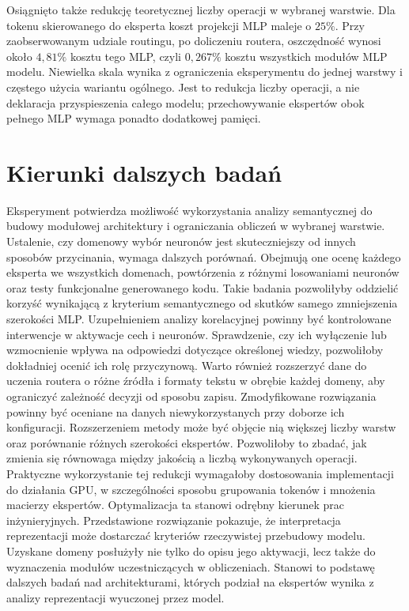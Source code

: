Osiągnięto także redukcję teoretycznej liczby operacji w wybranej warstwie. Dla tokenu skierowanego do eksperta koszt projekcji MLP maleje o $25\%$. Przy zaobserwowanym udziale routingu, po doliczeniu routera, oszczędność wynosi około $4{,}81\%$ kosztu tego MLP, czyli $0{,}267\%$ kosztu wszystkich modułów MLP modelu. Niewielka skala wynika z ograniczenia eksperymentu do jednej warstwy i częstego użycia wariantu ogólnego. Jest to redukcja liczby operacji, a nie deklaracja przyspieszenia całego modelu; przechowywanie ekspertów obok pełnego MLP wymaga ponadto dodatkowej pamięci.

\section{Kierunki dalszych badań}
\label{sec:dalsze_badania}

Eksperyment potwierdza możliwość wykorzystania analizy semantycznej do budowy modułowej architektury i ograniczania obliczeń w wybranej warstwie. Ustalenie, czy domenowy wybór neuronów jest skuteczniejszy od innych sposobów przycinania, wymaga dalszych porównań. Obejmują one ocenę każdego eksperta we wszystkich domenach, powtórzenia z różnymi losowaniami neuronów oraz testy funkcjonalne generowanego kodu. Takie badania pozwoliłyby oddzielić korzyść wynikającą z kryterium semantycznego od skutków samego zmniejszenia szerokości MLP. \newline
Uzupełnieniem analizy korelacyjnej powinny być kontrolowane interwencje w aktywacje cech i neuronów. Sprawdzenie, czy ich wyłączenie lub wzmocnienie wpływa na odpowiedzi dotyczące określonej wiedzy, pozwoliłoby dokładniej ocenić ich rolę przyczynową. Warto również rozszerzyć dane do uczenia routera o różne źródła i formaty tekstu w obrębie każdej domeny, aby ograniczyć zależność decyzji od sposobu zapisu. Zmodyfikowane rozwiązania powinny być oceniane na danych niewykorzystanych przy doborze ich konfiguracji. \newline
Rozszerzeniem metody może być objęcie nią większej liczby warstw oraz porównanie różnych szerokości ekspertów. Pozwoliłoby to zbadać, jak zmienia się równowaga między jakością a liczbą wykonywanych operacji. Praktyczne wykorzystanie tej redukcji wymagałoby dostosowania implementacji do działania GPU, w szczególności sposobu grupowania tokenów i mnożenia macierzy ekspertów. Optymalizacja ta stanowi odrębny kierunek prac inżynieryjnych. \newline
Przedstawione rozwiązanie pokazuje, że interpretacja reprezentacji może dostarczać kryteriów rzeczywistej przebudowy modelu. Uzyskane domeny posłużyły nie tylko do opisu jego aktywacji, lecz także do wyznaczenia modułów uczestniczących w obliczeniach. Stanowi to podstawę dalszych badań nad architekturami, których podział na ekspertów wynika z analizy reprezentacji wyuczonej przez model.
